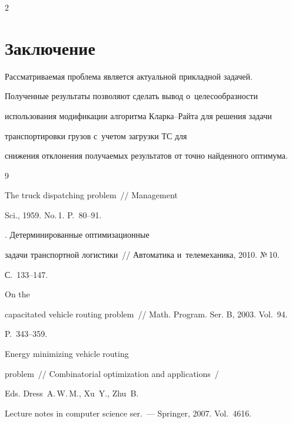 \begin{multicols}{2}
\section{Заключение}





  Рассматриваемая проблема является актуальной прикладной задачей.


Полученные результаты позволяют сделать вывод о~целесообразности


использования модификации алгоритма Клар\-ка--Рай\-та для решения задачи


транспортировки грузов с~учетом загрузки ТС для


снижения отклонения получаемых результатов от точно найденного оптимума.





{\small\frenchspacing


 {%




 \begin{thebibliography}{9}




 The truck dispatching problem~// Management


Sci., 1959. No.\,1. P.~80--91.




. Детерминированные оптимизационные


задачи транспортной логистики~// Автоматика и~телемеханика, 2010. №\,10.


С.~133--147.




 On the


capacitated vehicle routing problem~// Math. Program. Ser. B, 2003. Vol.~94.


P.~343--359.




 Energy minimizing vehicle routing


problem~// Combinatorial optimization and applications~/


Eds. Dress~A.\,W.\,M., Xu~Y., Zhu~B.


Lecture notes in computer science ser.~--- Springer, 2007. Vol.~4616.



\end{thebibliography}}}
\end{multicols}

